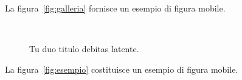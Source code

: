 La figura~\vref{fig:galleria} fornisce un esempio di figura mobile.

\lipsum[3]

\begin{figure}[tb]
\centering
{} \quad
{} \\
 \quad
{}
\caption[Tu duo titulo debitas latente]{Tu duo titulo debitas
latente.}
\label{fig:esempio}
\end{figure}

La figura~\vref{fig:esempio} costituisce un esempio di figura mobile.

\lipsum[4]
